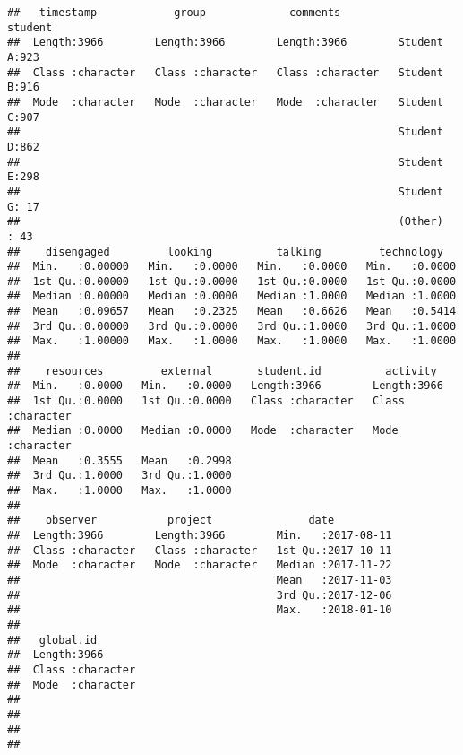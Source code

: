 \documentclass[]{article}
\begin{document}
\begin{verbatim}
##   timestamp            group             comments              student   
##  Length:3966        Length:3966        Length:3966        Student A:923  
##  Class :character   Class :character   Class :character   Student B:916  
##  Mode  :character   Mode  :character   Mode  :character   Student C:907  
##                                                           Student D:862  
##                                                           Student E:298  
##                                                           Student G: 17  
##                                                           (Other)  : 43  
##    disengaged         looking          talking         technology    
##  Min.   :0.00000   Min.   :0.0000   Min.   :0.0000   Min.   :0.0000  
##  1st Qu.:0.00000   1st Qu.:0.0000   1st Qu.:0.0000   1st Qu.:0.0000  
##  Median :0.00000   Median :0.0000   Median :1.0000   Median :1.0000  
##  Mean   :0.09657   Mean   :0.2325   Mean   :0.6626   Mean   :0.5414  
##  3rd Qu.:0.00000   3rd Qu.:0.0000   3rd Qu.:1.0000   3rd Qu.:1.0000  
##  Max.   :1.00000   Max.   :1.0000   Max.   :1.0000   Max.   :1.0000  
##                                                                      
##    resources         external       student.id          activity        
##  Min.   :0.0000   Min.   :0.0000   Length:3966        Length:3966       
##  1st Qu.:0.0000   1st Qu.:0.0000   Class :character   Class :character  
##  Median :0.0000   Median :0.0000   Mode  :character   Mode  :character  
##  Mean   :0.3555   Mean   :0.2998                                        
##  3rd Qu.:1.0000   3rd Qu.:1.0000                                        
##  Max.   :1.0000   Max.   :1.0000                                        
##                                                                         
##    observer           project               date           
##  Length:3966        Length:3966        Min.   :2017-08-11  
##  Class :character   Class :character   1st Qu.:2017-10-11  
##  Mode  :character   Mode  :character   Median :2017-11-22  
##                                        Mean   :2017-11-03  
##                                        3rd Qu.:2017-12-06  
##                                        Max.   :2018-01-10  
##                                                            
##   global.id        
##  Length:3966       
##  Class :character  
##  Mode  :character  
##                    
##                    
##                    
## 
\end{verbatim}
\end{document}
